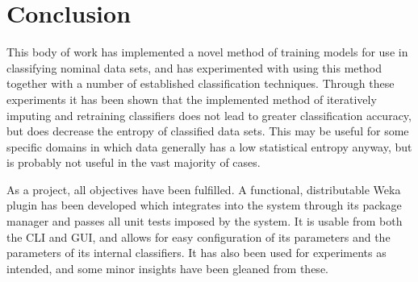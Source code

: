 \newpage
\chapter{Conclusion}
This body of work has implemented a novel method of training models for use in classifying nominal data sets, and has experimented with using this method together with a number of established classification techniques. Through these experiments it has been shown that the implemented method of iteratively imputing and retraining classifiers does not lead to greater classification accuracy, but does decrease the entropy of classified data sets. This may be useful for some specific domains in which data generally has a low statistical entropy anyway, but is probably not useful in the vast majority of cases.

As a project, all objectives have been fulfilled. A functional, distributable Weka plugin has been developed which integrates into the system through its package manager and passes all unit tests imposed by the system. It is usable from both the CLI and GUI, and allows for easy configuration of its parameters and the parameters of its internal classifiers. It has also been used for experiments as intended, and some minor insights have been gleaned from these.